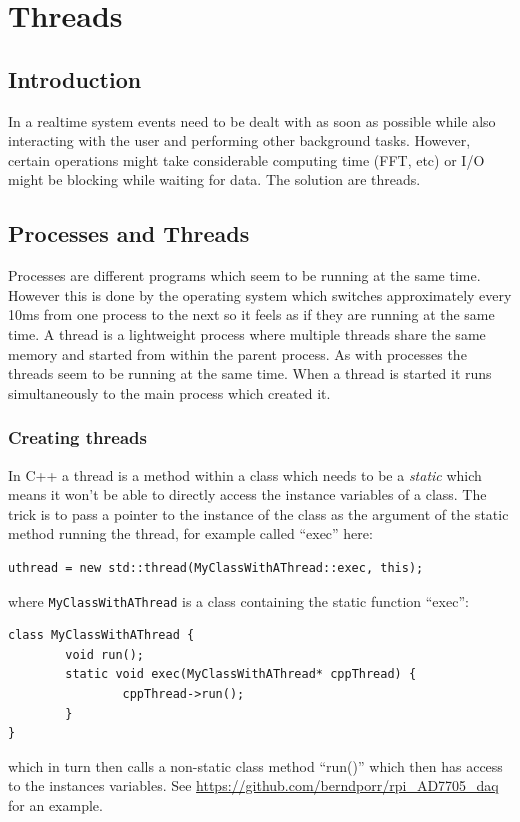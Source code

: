\documentclass[12pt]{report}
\begin{document}
\chapter{Threads}

\section{Introduction}
In a realtime system events need to be dealt with as soon as possible
while also interacting with the user and performing other background
tasks.  However, certain operations might take considerable computing
time (FFT, etc) or I/O might be blocking while waiting for data. The
solution are threads.


\section{Processes and Threads}
Processes are different programs which seem to be running at the same
time. However this is done by the operating system which switches
approximately every 10ms from one process to the next so it feels as
if they are running at the same time. A thread is a lightweight
process where multiple threads share the same memory and started from
within the parent process. As with processes the threads seem to be
running at the same time. When a thread is started it runs
simultaneously to the main process which created it.

\subsection{Creating threads}
In C++ a thread is a method within a class which needs
to be a \textsl{static} which means it won't be able to directly access the
instance variables of a class. The trick is to pass a pointer to
the instance of the class as the argument of the static method running
the thread, for example called ``exec'' here:
\begin{verbatim}
uthread = new std::thread(MyClassWithAThread::exec, this);
\end{verbatim}
where \texttt{MyClassWithAThread} is a class containing the static function ``exec'':
\begin{verbatim}
class MyClassWithAThread {
        void run();
        static void exec(MyClassWithAThread* cppThread) {
                cppThread->run();
        }
}
\end{verbatim}
which in turn then calls a non-static class method ``run()'' which
then has access to the instances variables.
See \url{https://github.com/berndporr/rpi_AD7705_daq} for an example.
\end{document}
